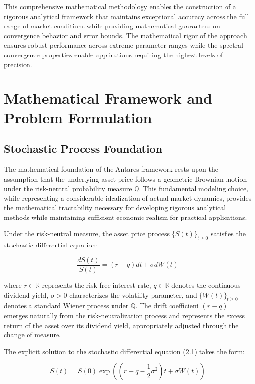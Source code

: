 \documentclass[
  american,
  11pt,
  11pt,
  letterpaper,
  onecolumn]{article}
\begin{document}
This comprehensive mathematical methodology enables the construction of
a rigorous analytical framework that maintains exceptional accuracy
across the full range of market conditions while providing mathematical
guarantees on convergence behavior and error bounds. The mathematical
rigor of the approach ensures robust performance across extreme
parameter ranges while the spectral convergence properties enable
applications requiring the highest levels of precision.

\section{Mathematical Framework and Problem
Formulation}\label{mathematical-framework-and-problem-formulation}

\subsection{Stochastic Process
Foundation}\label{stochastic-process-foundation}

The mathematical foundation of the Antares framework rests upon the
assumption that the underlying asset price follows a geometric Brownian
motion under the risk-neutral probability measure \(\mathbb{Q}\). This
fundamental modeling choice, while representing a considerable
idealization of actual market dynamics, provides the mathematical
tractability necessary for developing rigorous analytical methods while
maintaining sufficient economic realism for practical applications.

Under the risk-neutral measure, the asset price process
\(\{S(t)\}_{t \geq 0}\) satisfies the stochastic differential equation:

\[\frac{dS(t)}{S(t)} = (r-q)dt + \sigma dW(t) \tag{2.1}\]

where \(r \in \mathbb{R}\) represents the risk-free interest rate,
\(q \in \mathbb{R}\) denotes the continuous dividend yield,
\(\sigma > 0\) characterizes the volatility parameter, and
\(\{W(t)\}_{t \geq 0}\) denotes a standard Wiener process under
\(\mathbb{Q}\). The drift coefficient \((r-q)\) emerges naturally from
the risk-neutralization process and represents the excess return of the
asset over its dividend yield, appropriately adjusted through the change
of measure.

The explicit solution to the stochastic differential equation (2.1)
takes the form:

\[S(t) = S(0) \exp\left(\left(r-q-\frac{1}{2}\sigma^2\right)t + \sigma W(t)\right) \tag{2.2}\]
\end{document}

